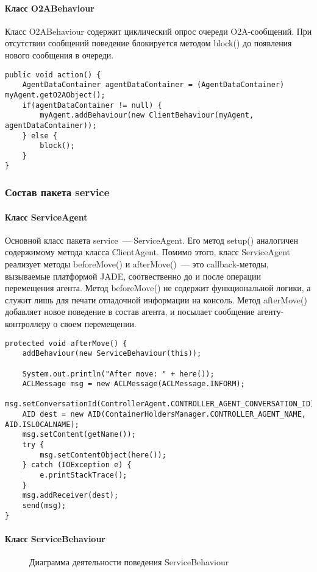 \paragraph{Класс O2ABehaviour}
Класс O2ABehaviour содержит циклический опрос очереди O2A-сообщений. При отсутствии сообщений поведение блокируется методом block() до появления нового сообщения в очереди.
\begin{lstlisting}
public void action() {
    AgentDataContainer agentDataContainer = (AgentDataContainer) myAgent.getO2AObject();
    if(agentDataContainer != null) {
        myAgent.addBehaviour(new ClientBehaviour(myAgent, agentDataContainer));
    } else {
        block();
    }
}
\end{lstlisting}

\subsubsection{Состав пакета service}
\paragraph{Класс ServiceAgent}
Основной класс пакета service~--- ServiceAgent. Его метод setup() аналогичен содержимому метода класса ClientAgent. Помимо этого, класс ServiceAgent реализует методы beforeMove() и afterMove()~--- это callback-методы, вызываемые платформой JADE, соотвественно до и после операции перемещения агента. Метод beforeMove() не содержит функциональной логики, а служит лишь для печати отладочной информации на консоль. Метод afterMove() добавляет новое поведение в состав агента, и посылает сообщение агенту-контроллеру о своем перемещении.
\begin{lstlisting}
protected void afterMove() {
    addBehaviour(new ServiceBehaviour(this));

    System.out.println("After move: " + here());
    ACLMessage msg = new ACLMessage(ACLMessage.INFORM);
    msg.setConversationId(ControllerAgent.CONTROLLER_AGENT_CONVERSATION_ID);
    AID dest = new AID(ContainerHoldersManager.CONTROLLER_AGENT_NAME, AID.ISLOCALNAME);
    msg.setContent(getName());
    try {
        msg.setContentObject(here());
    } catch (IOException e) {
        e.printStackTrace();
    }
    msg.addReceiver(dest);
    send(msg);
}
\end{lstlisting}

\paragraph{Класс ServiceBehaviour}
\begin{figure}[h!]
\caption{Диаграмма деятельности поведения ServiceBehaviour}
\label{3:service-beh}
\end{figure}

